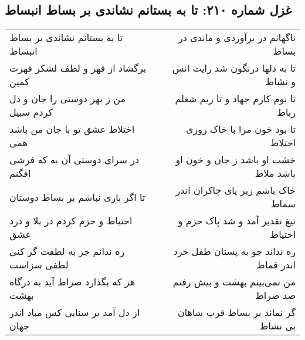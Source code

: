 \begin{center}
\section*{غزل شماره ۲۱۰: تا به بستانم نشاندی بر بساط انبساط}
\label{sec:210}
\begin{longtable}{l p{0.5cm} r}
تا به بستانم نشاندی بر بساط انبساط
&&
ناگهانم در برآوردی و ماندی در بساط
\\
برگشاد از قهر و لطف لشکر قهرت کمین
&&
تا به دلها درنگون شد رایت انس و نشاط
\\
من ز بهر دوستی را جان و دل کردم سبیل
&&
تا بوم کارم جهاد و تا زیم شغلم رباط
\\
اختلاط عشق تو با جان من باشد همی
&&
تا بود خون مرا با خاک روزی اختلاط
\\
در سرای دوستی آن به که فرشی افگنم
&&
خشت او باشد ز جان و خون او باشد ملاط
\\
تا اگر باری نباشم بر بساط دوستان
&&
خاک باشم زیر پای چاکران اندر سماط
\\
احتیاط و حزم کردم در بلا و درد عشق
&&
تیغ تقدیر آمد و شد پاک حزم و احتیاط
\\
ره ندانم جز به لطفت گر کنی لطفی سزاست
&&
ره نداند جو به پستان طفل خرد اندر قماط
\\
هر که بگذارد صراط آید به درگاه بهشت
&&
من نمی‌بینم بهشت و بیش رفتم صد صراط
\\
از دل آمد بر سنایی کس مباد اندر جهان
&&
گر نماند بر بساط قرب شاهان بی نشاط
\\
\end{longtable}
\end{center}
